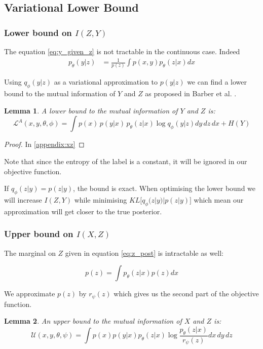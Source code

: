 \documentclass[11pt,oneside,openright]{report}
\newtheorem{lemma}{Lemma}
\begin{document}
\subsection{Variational Lower Bound}

\subsubsection{Lower bound on $I(Z, Y)$}
The equation \ref{eq:y_given_z} is not tractable in the continuous case. Indeed
\begin{align}
p_\theta(y|z) &= \frac{1}{p(z)} \int p(x, y) p_\theta(z|x) dx
\end{align}

Using $q_\phi(y|z)$ as a variational approximation to $p(y|z)$ we can find a lower bound to the mutual information of $Y$ and $Z$ as proposed in Barber et al. \cite{barber}.

\begin{lemma}
A lower bound to the mutual information of $Y$ and $Z$ is:
$$ \mathcal{L}^{A}(x, y, \theta, \phi) = \int p(x)\, p(y|x)\, p_\theta(z|x) \log q_\phi(y|z) dy\, dz\, dx + H(Y)$$
\end{lemma}

\begin{proof} In \ref{appendix:xz}\end{proof}
Note that since the entropy of the label is a constant, it will be ignored in our objective function.

If $q_\phi(z|y) = p(z|y)$, the bound is exact. When optimising the lower bound we will increase $I(Z, Y)$ while minimising $KL\big[q_\phi(z|y)|p(z|y)\big]$ which mean our approximation will get closer to the true posterior.

\subsubsection{Upper bound on $I(X, Z)$}
The marginal on $Z$ given in equation \ref{eq:z_post} is intractable as well:

$$ p(z) = \int p_\theta(z|x) p(z) dx $$

We approximate $p(z)$ by $r_\psi(z)$ which gives us the second part of the objective function. 

\begin{lemma}
An upper bound to the mutual information of $X$ and $Z$ is:
$$ \mathcal{U}(x, y, \theta, \psi) = \int p(x)p(y|x)p_\theta(z|x) \log \frac{p_\theta(z|x)}{r_\psi(z)}dx\, dy\, dz$$
\end{lemma}
\end{document}
